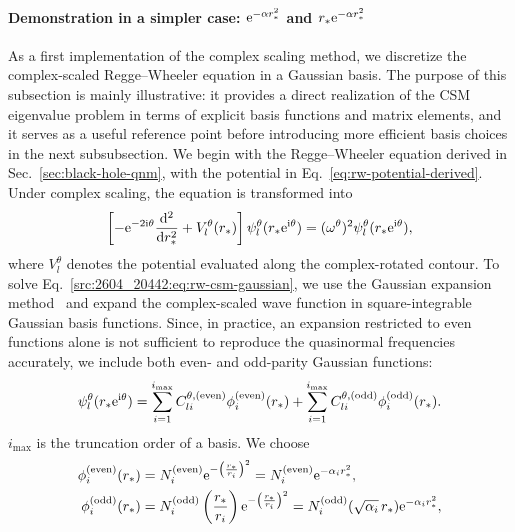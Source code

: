 \paragraph{Demonstration in a simpler case: $\mathrm{e}^{-\alpha r_*^2}$ and $r_* \mathrm{e}^{-\alpha r_*^2}$}
As a first implementation of the complex scaling method, we discretize the
complex-scaled Regge--Wheeler equation in a Gaussian basis.
The purpose of this subsection is mainly illustrative:
it provides a direct realization of the CSM eigenvalue problem in terms of
explicit basis functions and matrix elements, and it serves as a useful
reference point before introducing more efficient basis choices in the next
subsubsection.
We begin with the Regge--Wheeler equation derived in
Sec.~\ref{sec:black-hole-qnm}, with the potential in
Eq.~\eqref{eq:rw-potential-derived}.
Under complex scaling, the equation is transformed into
\begin{align}
    \left[
        -\mathrm{e}^{-2\mathrm{i}\theta}\frac{\mathrm{d}^2}{\mathrm{d} r_*^2}
        + V_l^\theta(r_*)
    \right]
    \psi_l^\theta(r_*\mathrm{e}^{\mathrm{i}\theta})
    =
    (\omega^\theta)^2 \psi_l^\theta(r_*\mathrm{e}^{\mathrm{i}\theta}),
    \label{src:2604_20442:eq:rw-csm-gaussian}
\end{align}
where $V_l^\theta$ denotes the potential evaluated along the
complex-rotated contour.
To solve Eq.~\eqref{src:2604_20442:eq:rw-csm-gaussian}, we use the Gaussian expansion method~\cite{Hiyama:2003cu} and expand the complex-scaled
wave function in square-integrable Gaussian basis functions.
Since, in practice, an expansion restricted to even functions alone is not
sufficient to reproduce the quasinormal frequencies accurately, we include
both even- and odd-parity Gaussian functions:
\begin{align}
    \psi_l^\theta(r_*\mathrm{e}^{\mathrm{i}\theta})
    =
    \sum_{i=1}^{i_{\max}}
    C_{l i}^{\theta,\mathrm{(even)}}
    \phi_i^{\mathrm{(even)}}(r_*)
    +
    \sum_{i=1}^{i_{\max}}
    C_{l i}^{\theta,\mathrm{(odd)}}
    \phi_i^{\mathrm{(odd)}}(r_*).
    \label{src:2604_20442:eq:gaussian-expansion}
\end{align}
$i_{\max}$ is the truncation order of a basis.
We choose
\begin{align}
    \phi^{\mathrm{(even)}}_i(r_*)
    &= N^{\mathrm{(even)}}_i
    \mathrm{e}^{ -\left(\frac{r_*}{r_i}\right)^2 }
    = N^{\mathrm{(even)}}_i \mathrm{e}^{-\alpha_i r_*^2},
    \\
    \phi^{\mathrm{(odd)}}_i(r_*)
    &= N^{\mathrm{(odd)}}_i
    \left(\frac{r_*}{r_i}\right) \mathrm{e}^{ -\left(\frac{r_*}{r_i}\right)^2 }
    = N^{\mathrm{(odd)}}_i (\sqrt{\alpha_i}\, r_*) \mathrm{e}^{-\alpha_i r_*^2},
\end{align}
